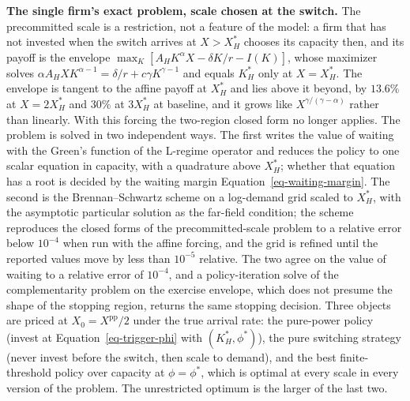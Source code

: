 \documentclass[
  11pt,
  letterpaper,
]{scrartcl}
\begin{document}
\textbf{The single firm's exact problem, scale chosen at the switch.}
The precommitted scale is a restriction, not a feature of the model: a
firm that has not invested when the switch arrives at \(X > X_H^*\)
chooses its capacity then, and its payoff is the envelope
\(\max_K [A_H K^\alpha X - \delta K/r - I(K)]\), whose maximizer solves
\(\alpha A_H X K^{\alpha-1} = \delta/r + c\gamma K^{\gamma-1}\) and
equals \(K_H^*\) only at \(X = X_H^*\). The envelope is tangent to the
affine payoff at \(X_H^*\) and lies above it beyond, by \(13.6\%\) at
\(X = 2X_H^*\) and \(30\%\) at \(3X_H^*\) at baseline, and it grows like
\(X^{\gamma/(\gamma - \alpha)}\) rather than linearly. With this forcing
the two-region closed form no longer applies. The problem is solved in
two independent ways. The first writes the value of waiting with the
Green's function of the L-regime operator and reduces the policy to one
scalar equation in capacity, with a quadrature above \(X_H^*\); whether
that equation has a root is decided by the waiting margin
Equation~\ref{eq-waiting-margin}. The second is the Brennan--Schwartz
scheme on a log-demand grid scaled to \(X_H^*\), with the asymptotic
particular solution as the far-field condition; the scheme reproduces
the closed forms of the precommitted-scale problem to a relative error
below \(10^{-4}\) when run with the affine forcing, and the grid is
refined until the reported values move by less than \(10^{-5}\)
relative. The two agree on the value of waiting to a relative error of
\(10^{-4}\), and a policy-iteration solve of the complementarity problem
on the exercise envelope, which does not presume the shape of the
stopping region, returns the same stopping decision. Three objects are
priced at \(X_0 = X^{\text{pp}}/2\) under the true arrival rate: the
pure-power policy (invest at Equation~\ref{eq-trigger-phi} with
\((K_H^*, \phi^*)\)), the pure switching strategy (never invest before
the switch, then scale to demand), and the best finite-threshold policy
over capacity at \(\phi = \phi^*\), which is optimal at every scale in
every version of the problem. The unrestricted optimum is the larger of
the last two.
\end{document}
